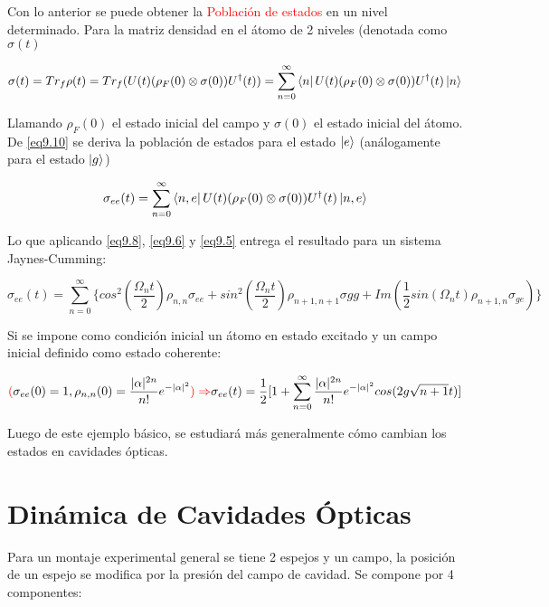 \documentclass{book}
\begin{document}
Con lo anterior se puede obtener la \textcolor{red}{Población de estados} en un nivel determinado. Para la matriz densidad en el átomo de 2 niveles (denotada como $\sigma(t)$

\begin{equation}\label{eq9.9}\sigma(t)=Tr_f\rho(t)=Tr_f(U(t)(\rho_F(0)\otimes\sigma(0))U^\dag(t))=\sum_{n=0}^\infty\bra{n}U(t)(\rho_F(0)\otimes\sigma(0))U^\dag(t)\ket{n}\end{equation}

Llamando $\rho_F(0)$ el estado inicial del campo y $\sigma(0)$ el estado inicial del átomo. De \ref{eq9.10} se deriva la población de estados para el estado $\ket{e}$ (análogamente para el estado $\ket{g}$)

\begin{equation}\label{eq9.10}\sigma_{ee}(t)=\sum_{n=0}^\infty\bra{n,e}U(t)(\rho_F(0)\otimes\sigma(0))U^\dag(t)\ket{n,e}\end{equation}

Lo que aplicando  \ref{eq9.8}, \ref{eq9.6} y \ref{eq9.5} entrega el resultado para un sistema Jaynes-Cumming:

\begin{equation}\label{eq9.11}\sigma_{ee}(t)=\sum_{n=0}^\infty \{cos^2(\frac{\Omega_n t}{2})\rho_{n,n}\sigma_{ee}+sin^2(\frac{\Omega_n t}{2})\rho_{n+1,n+1}\sigma{gg}+Im(\frac{1}{2}sin(\Omega_n t)\rho_{n+1,n}\sigma_{ge})\}\end{equation}

Si se impone como condición inicial un átomo en estado excitado y un campo inicial definido como estado coherente:

\begin{equation}\label{eq9.12}\textcolor{red}{(}\sigma_{ee}(0)=1, \rho_{n,n}(0)=\frac{\lvert\alpha\rvert^{2n}}{n!}e^{-\lvert\alpha\rvert^2}\textcolor{red}{)\Rightarrow}\sigma_{ee}(t)=\frac{1}{2}[1+\sum_{n=0}^\infty\frac{\lvert\alpha\rvert^{2n}}{n!}e^{-\lvert\alpha\rvert^2}cos(2g\sqrt{n+1}t)]\end{equation}

Luego de este ejemplo básico, se estudiará más generalmente cómo cambian los estados en cavidades ópticas.

\section{Dinámica de  Cavidades Ópticas}

Para un montaje experimental general se tiene 2 espejos y un campo, la posición de un espejo se modifica por la presión del campo de cavidad. Se compone por 4 componentes:
\end{document}
